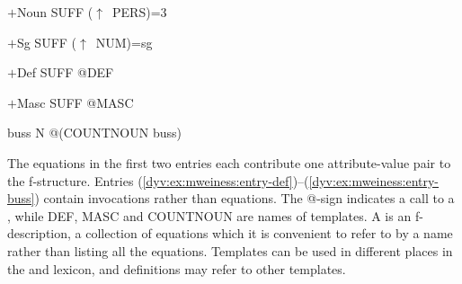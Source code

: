 \documentclass[output=paper]{langsci/langscibook}
\begin{document}
\ea\label{dyv:ex:mweiness:entry-noun}
{\small 
$+$Noun \hspace{0.4em} SUFF \hspace{0.4em} ($\uparrow$~PERS)=3
}
\z

\ea\label{dyv:ex:mweiness:entry-sg}
{\small 
$+$Sg \hspace{1.7em} SUFF \hspace{0.4em} ($\uparrow$~NUM)=sg
}
\z

\ea\label{dyv:ex:mweiness:entry-def}
{\small 
$+$Def  \hspace{1.2em} SUFF \hspace{0.4em} @DEF
}
\z

\ea\label{dyv:ex:mweiness:entry-masc}
{\small 
$+$Masc  \hspace{0.6em} SUFF \hspace{0.4em} @MASC
}
\z


\ea\label{dyv:ex:mweiness:entry-buss}
{\small 
buss  \hspace{1.5em} N \hspace{1.8em} @(COUNTNOUN buss)
}
\z


The equations in the first two entries each contribute one attribute-value pair to the f-structure.
Entries (\ref{dyv:ex:mweiness:entry-def})--(\ref{dyv:ex:mweiness:entry-buss}) contain  invocations rather than equations.
The @-sign indicates a call to a , while DEF, MASC and COUNTNOUN are names of templates.
A  is an f-description, a collection of equations which it is convenient to refer to by a name rather than listing all the equations.
Templates can be used in different places in the  and lexicon, and  definitions may refer to other templates.
\end{document}
